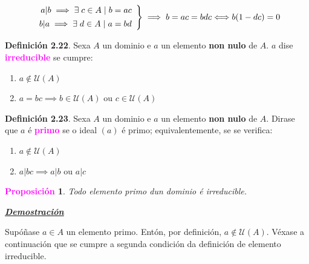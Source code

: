 \documentclass[twoside]{report}
\newcommand{\magbf}[1]{\textcolor{magenta}{\textbf{#1}}} %
\theoremstyle{mystyle}
\newtheorem{prop}{\magbf{Proposición}}[chapter]
\newenvironment{proposition}
{\begin{mdframed}[linecolor = magenta,backgroundcolor = classicrose, linewidth = 2mm]\begin{prop}}
{\end{prop}\end{mdframed}}
\begin{document}
\[ 
\left. \begin{array}{r} 
a|b \implies \exists \hspace{1mm} c \in A \hspace{1mm} | \hspace{1mm} b = ac\\[1ex]
b|a \implies \exists \hspace{1mm} d \in A \hspace{1mm} | \hspace{1mm} a = bd\\
\end{array} \right\} 
\implies b = ac = bdc \Longleftrightarrow b(1 - dc) = 0
\]

\vspace{3mm}

\noindent \textbf{Definición 2.22}. Sexa $A$ un dominio e $a$ un elemento \textbf{non nulo} de $A$. $a$ dise \magbf{irreducible} se cumpre:

\begin{enumerate}
    \item $a \notin \mathcal{U}(A)$
    \item $a = bc \implies b \in \mathcal{U}(A)$ ou $c \in \mathcal{U}(A)$\\
\end{enumerate}

\noindent \textbf{Definición 2.23}. Sexa $A$ un dominio e $a$ un elemento \textbf{non nulo} de $A$. Dirase que $a$ é \magbf{primo} se o ideal $(a)$ é primo; equivalentemente, se se verifica:

\begin{enumerate}
    \item $a \notin \mathcal{U}(A)$
    \item $a | bc \implies a | b$ ou $a | c$
\end{enumerate}

\begin{proposition} \label{prop2.12}
Todo elemento primo dun dominio é irreducible.
\end{proposition}

\vspace{2mm}

\noindent \textbf{\textit{\underline{Demostración}}}

\vspace{2mm}

\noindent Supóñase $a\in A$ un elemento primo. Entón, por definición, $a \notin \mathcal{U}(A)$. Véxase a continuación que se cumpre a segunda condición da definición de elemento irreducible.\\
\end{document}
